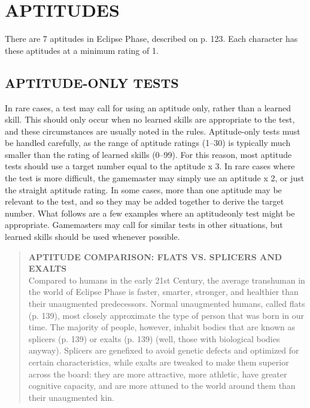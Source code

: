 \section{APTITUDES} There are 7 aptitudes in Eclipse Phase, described on p. 123. Each character has these aptitudes at a minimum rating of 1. 

\subsection{APTITUDE-ONLY TESTS} In rare cases, a test may call for using an aptitude only, rather than a learned skill. This should only occur when no learned skills are appropriate to the test, and these circumstances are usually noted in the rules. Aptitude-only tests must be handled carefully, as the range of aptitude ratings (1–30) is typically much smaller than the rating of learned skills (0–99). For this reason, most aptitude tests should use a target number equal to the aptitude x 3. In rare cases where the test is more difficult, the gamemaster may simply use an aptitude x 2, or just the straight aptitude rating. In some cases, more than one aptitude may be relevant to the test, and so they may be added together to derive the target number. What follows are a few examples where an aptitudeonly test might be appropriate. Gamemasters may call for similar tests in other situations, but learned skills should be used whenever possible. 





\begin{quotation} \textbf{APTITUDE COMPARISON: FLATS VS. SPLICERS AND EXALTS} \\ Compared to humans in the early 21st Century, the average transhuman in the world of Eclipse Phase is faster, smarter, stronger, and healthier than their unaugmented predecessors. Normal unaugmented humans, called flats (p. 139), most closely approximate the type of person that was born in our time. The majority of people, however, inhabit bodies that are known as splicers (p. 139) or exalts (p. 139) (well, those with biological bodies anyway). Splicers are genefixed to avoid genetic defects and optimized for certain characteristics, while exalts are tweaked to make them superior across the board: they are more attractive, more athletic, have greater cognitive capacity, and are more attuned to the world around them than their unaugmented kin. \end{quotation} 



